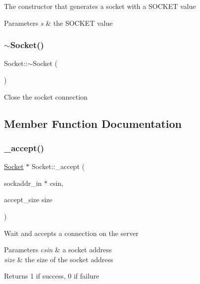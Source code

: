 The constructor that generates a socket with a S\+O\+C\+K\+ET value


\begin{DoxyParams}{Parameters}
{\em s} & the S\+O\+C\+K\+ET value \\
\hline
\end{DoxyParams}
\mbox{\label{classSocket_aeac4eb6379a543d38ed88977d3b6630a}} 
\subsubsection{\texorpdfstring{$\sim$\+Socket()}{~Socket()}}
{\footnotesize\ttfamily Socket\+::$\sim$\+Socket (\begin{DoxyParamCaption}{ }\end{DoxyParamCaption})}

Close the socket connection 

\subsection{Member Function Documentation}
\mbox{\label{classSocket_a153f0c90d33f1d60133b3ab565679013}} 
\subsubsection{\texorpdfstring{\+\_\+accept()}{\_accept()}}
{\footnotesize\ttfamily \mbox{\hyperlink{classSocket}{Socket}} $\ast$ Socket\+::\+\_\+accept (\begin{DoxyParamCaption}\item[{sockaddr\+\_\+in $\ast$}]{csin,  }\item[{accept\+\_\+size}]{size }\end{DoxyParamCaption})}

Wait and accepts a connection on the server


\begin{DoxyParams}{Parameters}
{\em csin} & a socket address \\
\hline
{\em size} & the size of the socket address \\
\hline
\end{DoxyParams}
\begin{DoxyReturn}{Returns}
1 if success, 0 if failure 
\end{DoxyReturn}
\mbox{\label{classSocket_ab7c6b44800e7a621df9edae86d5fdfa8}} 
